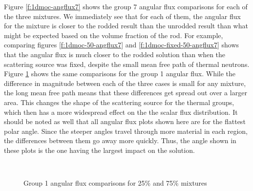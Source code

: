 Figure \ref{f:1dmoc-angflux7} shows the group 7 angular flux comparisons for each of the three mixtures.  We immediately see that for each of them, the angular flux for the mixture is closer to the rodded result than the unrodded result than what might be expected based on the volume fraction of the rod.  For example, comparing figures \ref{f:1dmoc-50-angflux7} and \ref{f:1dmoc-fixed-50-angflux7} shows that the angular flux is much closer to the rodded solution than when the scattering source was fixed, despite the small mean free path of thermal neutrons.  Figure \ref{f:1dmoc-angflux1} shows the same comparisons for the group 1 angular flux.  While the difference in magnitude between each of the three cases is small for any mixture, the long mean free path means that these differences get spread out over a larger area.  This changes the shape of the scattering source for the thermal groups, which then has a more widespread effect on the the scalar flux distribution.  It should be noted as well that all angular flux plots shown here are for the flattest polar angle.  Since the steeper angles travel through more material in each region, the differences between them go away more quickly.  Thus, the angle shown in these plots is the one having the largest impact on the solution.

\begin{figure}[h]
  \centering
  ~
  ~
  \caption{Group 1 angular flux comparisons for 25\% and 75\% mixtures}\label{f:1dmoc-angflux1}
\end{figure}

